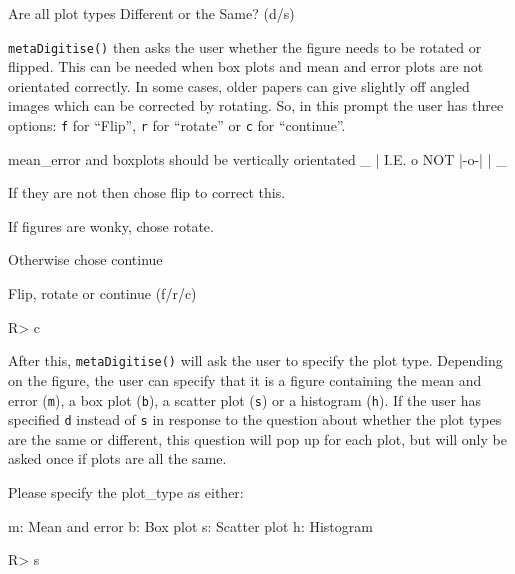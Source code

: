\documentclass[12pt]{article}
\newcommand{\code}[1]{\texttt{#1}}
\newcommand{\fct}[1]{\texttt{#1()}}
\begin{document}
\begin{CodeChunk}
\begin{CodeOutput}
Are all plot types Different or the Same? (d/s)
\end{CodeOutput}
\end{CodeChunk}

\fct{metaDigitise} then asks the user whether the figure needs to be rotated or flipped. This can be needed when box plots and mean and error plots are not orientated correctly. In some cases, older papers can give slightly off angled images which can be corrected by rotating. So, in this prompt the user has three options: \code{f} for ``Flip'', \code{r} for ``rotate'' or \code{c} for ``continue''. 

\begin{CodeChunk}
\begin{CodeOutput}
mean_error and boxplots should be vertically orientated
       _ 
       |  
  I.E. o    NOT  |-o-|
       |
       _

If they are not then chose flip to correct this.

If figures are wonky, chose rotate.

Otherwise chose continue

Flip, rotate or continue (f/r/c) 
\end{CodeOutput}
\begin{CodeInput}
R> c
\end{CodeInput}
\end{CodeChunk}

After this, \fct{metaDigitise} will ask the user to specify the plot type. Depending on the figure, the user can specify that it is a figure containing the mean and error (\code{m}), a box plot (\code
{b}), a scatter plot (\code{s}) or a histogram (\code{h}). If the user has specified \code{d} instead of \code{s} in response to the question about whether the plot types are the same or different, this question will pop up for each plot, but will only be asked once if plots are all the same.

\begin{CodeChunk}
\begin{CodeOutput}
Please specify the plot_type as either:

 m: Mean and error
 b: Box plot
 s: Scatter plot 
 h: Histogram
\end{CodeOutput}
\begin{CodeInput}
R> s
\end{CodeInput}
\end{CodeChunk}
\end{document}
